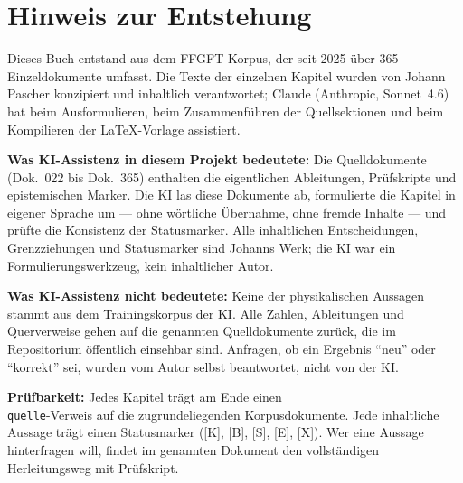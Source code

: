 \chapter*{Hinweis zur Entstehung}

Dieses Buch entstand aus dem FFGFT-Korpus, der seit 2025 über 365
Einzeldokumente umfasst. Die Texte der einzelnen Kapitel wurden von
Johann Pascher konzipiert und inhaltlich verantwortet; Claude
(Anthropic, Sonnet~4.6) hat beim Ausformulieren, beim Zusammenführen
der Quellsektionen und beim Kompilieren der \LaTeX-Vorlage assistiert.

\medskip\noindent\textbf{Was KI-Assistenz in diesem Projekt bedeutete:}
Die Quelldokumente (Dok.~022 bis Dok.~365) enthalten die eigentlichen
Ableitungen, Prüfskripte und epistemischen Marker. Die KI las diese
Dokumente ab, formulierte die Kapitel in eigener Sprache um --- ohne
wörtliche Übernahme, ohne fremde Inhalte --- und prüfte die Konsistenz
der Statusmarker. Alle inhaltlichen Entscheidungen, Grenzziehungen und
Statusmarker sind Johanns Werk; die KI war ein Formulierungswerkzeug,
kein inhaltlicher Autor.

\medskip\noindent\textbf{Was KI-Assistenz nicht bedeutete:}
Keine der physikalischen Aussagen stammt aus dem Trainingskorpus der KI.
Alle Zahlen, Ableitungen und Querverweise gehen auf die genannten
Quelldokumente zurück, die im Repositorium öffentlich einsehbar sind.
Anfragen, ob ein Ergebnis \enquote{neu} oder \enquote{korrekt} sei,
wurden vom Autor selbst beantwortet, nicht von der KI.

\medskip\noindent\textbf{Prüfbarkeit:} Jedes Kapitel trägt am Ende
einen \texttt{\\quelle}-Verweis auf die zugrundeliegenden
Korpusdokumente. Jede inhaltliche Aussage trägt einen Statusmarker
([K], [B], [S], [E], [X]). Wer eine Aussage hinterfragen will,
findet im genannten Dokument den vollständigen Herleitungsweg mit
Prüfskript.
